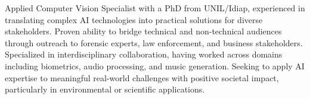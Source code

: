 


\begin{cvparagraph}
Applied Computer Vision Specialist with a PhD from UNIL/Idiap, experienced in translating complex AI technologies into practical solutions for diverse stakeholders. Proven ability to bridge technical and non-technical audiences through outreach to forensic experts, law enforcement, and business stakeholders. Specialized in interdisciplinary collaboration, having worked across domains including biometrics, audio processing, and music generation. Seeking to apply AI expertise to meaningful real-world challenges with positive societal impact, particularly in environmental or scientific applications.
\end{cvparagraph}
